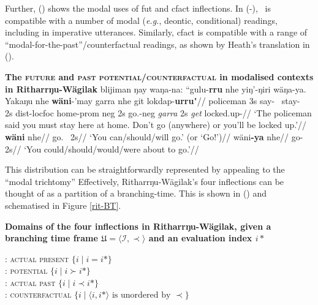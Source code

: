 \noindent Further, () shows the modal uses of \gls{fut} and \gls{cfact} inflections. In (-), \II~is compatible with a number of modal (\textit{e.g.}, deontic, conditional) readings, including in imperative utterances. Similarly, \gls{cfact} is compatible with a range of ``modal-for-the-past''/counterfactual readings, as shown by Heath's translation in ().


\pex \textbf{The \textsc{future} and \textsc{past potential/counterfactual} in modalised contexts in Ritharrŋu-Wägilak}
\a \begingl\gla blijiman ŋay waŋa-na: ``gulu-\textbf{rru} nhe yiŋ'-ŋiri wäŋa-ya. Yakaŋu nhe \textbf{wäni}-'may garra nhe git lokdap-\textbf{urru}"//
\glb policeman 3s say-\III~ stay-\II~ 2s \gls{dist}-\gls{loc}\textdblhyphen\gls{foc} home-\gls{prom} \gls{neg} 2s go.\II-\gls{neg} \textit{garra} 2s \textit{get} locked.up-\II//
\glft`The policeman said you must stay here at home. Don't go (anywhere) or you'll be locked up.'\trailingcitation{[RŊ~20190520~18']}//\endgl
\a\begingl\gla \textbf{wäni} nhe//
\glb go.\II~ 2s//
\glft `You can/should/will go.' (or `Go!')//\endgl
\a\begingl\gla wäni\textbf{-ya} nhe//
\glb go-\V~ 2s//
\glft`You could/should/would/were about to go.'//\endgl
\xe

This distribution can be straightforwardly represented by appealing to the ``modal trichtomy'' \citetext{\textit{cf.} \citet{VonPrince2019,VonPrincea} --- introduced in \S \ref{vP-trich}, compare (), \textit{p.}~.} Effectively, Ritharrŋu-Wägilak's four inflections can be thought of as a partition of a branching-time. This is shown in (\nextx) and schematised in Figure \ref{rit-BT}.


\pex \textbf{Domains of the four inflections in Ritharrŋu-Wägilak, given a branching time frame $ \mathfrak U =\langle\mathcal I,\prec\rangle$ and an evaluation index $ i* $}


  : \textsc{actual present} $ \{i\mid i = i*\} $\\
  : \textsc{potential} $ \{i\mid i \succ i*\} $\\
  : \textsc{actual past} $ \{i\mid i \prec i*\} $\\
  : \textsc{counterfactual} $ \{i\mid \langle i,i*\rangle\text{ is unordered by }\prec\} $
\xe

